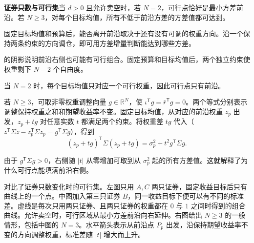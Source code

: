 \begin{tcolorbox}[knowledge]
\textbf{证券只数与可行集}\quad 当 $d>0$ 且允许卖空时，若 $N=2$，可行点恰好是最小方差前沿。若 $N\ge3$，对每个目标均值，所有不低于前沿方差的方差值都可达到。
\end{tcolorbox}

固定目标均值和预算后，能否离开前沿取决于还有没有可调的权重方向。沿一个保持两条约束的方向调仓，即可用方差增量判断能达到哪些方差。

\begin{solution}[label-content={证明},blank-type=none]
 的阴影说明前沿右侧也可能有可行组合。固定预算和目标均值后，两个独立约束使权重剩下 $N-2$ 个自由度。

当 $N=2$ 时，每个目标均值只对应一个可行权重，因此可行点只有前沿。

若 $N\ge3$，可取非零权重调整向量 $g\in\mathbb R^N$，使 $\iota^{\mathsf T}g=\bar r^{\mathsf T}g=0$。两个等式分别表示调整保持权重之和和期望收益率不变。固定目标均值，从对应的前沿权重 $z_p$ 出发，$z_p+tg$ 对任意实数 $t$ 都满足两个约束。将权重差 $tg$ 代入（$z^{\mathsf T}\Sigma z-z_p^{\mathsf T}\Sigma z_p=g^{\mathsf T}\Sigma g$），得到
\[
 (z_p+tg)^{\mathsf T}\Sigma(z_p+tg)=\sigma_p^2+t^2g^{\mathsf T}\Sigma g.
\]

由于 $g^{\mathsf T}\Sigma g>0$，右侧随 $|t|$ 从零增加可取到从 $\sigma_p^2$ 起的所有方差值。这就解释了为什么可行点能填满前沿右侧。
\end{solution}

对比了证券只数变化时的可行集。左图只用 $A,C$ 两只证券，固定收益目标后只有曲线上的一个点。中图加入第三只证券 $B$，同一收益目标下便可以有不同的标准差。虚线是每次只用两只证券、且两只证券的权重都在 $0$ 与 $1$ 之间时得到的组合曲线。允许卖空时，可行区域从最小方差前沿向右延伸。右图给出 $N\ge3$ 的一般情形，包括中图的 $N=3$。水平箭头表示从前沿点 $P_p$ 出发，沿保持期望收益率不变的方向调整权重，标准差随 $|t|$ 增大而上升。

\begin{center}
\begin{minipage}{\linewidth}
\centering
\renewcommand{\thewjFigure}{\thechapter.S\arabic{wjFigure}}%
%
\par
{}
\end{minipage}
\end{center}

